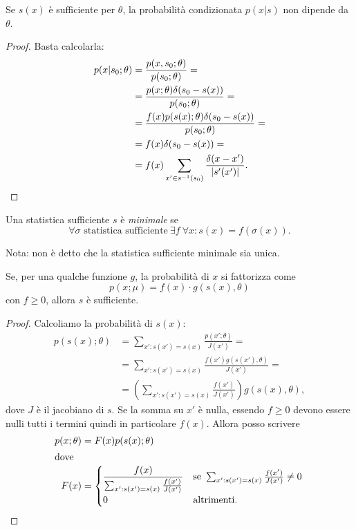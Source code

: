\begin{theorem}
	Se $s(x)$ è sufficiente per $\theta$,
	la probabilità condizionata $p(x|s)$ non dipende da $\theta$.
\end{theorem}

\begin{proof}
	Basta calcolarla:
	\begin{align*}
		p(x|s_0;\theta)
		&= \frac {p(x,s_0;\theta)} {p(s_0;\theta)} = \\
		&= \frac {p(x;\theta) \delta(s_0-s(x))} {p(s_0;\theta)} = \\
		&= \frac {f(x) p(s(x);\theta) \delta(s_0-s(x))} {p(s_0;\theta)} = \\
		&= f(x) \delta(s_0-s(x)) = \\
		&= f(x) \sum_{x'\in s^{-1}(s_0)} \frac {\delta(x-x')} {|s'(x')|}. \qedhere
	\end{align*}
\end{proof}

\begin{definition}
	Una statistica sufficiente $s$ è \emph{minimale} se
	\begin{equation*}
		\forall \sigma \text{ statistica sufficiente}\ \exists f\ \forall x:
		s(x) = f(\sigma(x)).
	\end{equation*}
\end{definition}
\noindent Nota: non è detto che la statistica sufficiente minimale sia unica.

\begin{theorem}
	\label{th:suffatt}
	Se, per una qualche funzione $g$, la probabilità di $x$ si fattorizza come
	\begin{equation*}
		p(x;\mu) = f(x)\cdot g(s(x),\theta)
	\end{equation*}
	con $f\ge 0$, allora $s$ è sufficiente.
\end{theorem}

\begin{proof}
	Calcoliamo la probabilità di $s(x)$:
	\begin{align*}
		p(s(x);\theta)
		&= \sum_{x':s(x')=s(x)} \frac{p(x';\theta)}{J(x')} = \\
		&= \sum_{x':s(x')=s(x)} \frac{f(x') g(s(x'),\theta)}{J(x')} = \\
		&= \left( \sum_{x':s(x')=s(x)} \frac{f(x')}{J(x')} \right) g(s(x),\theta),
	\end{align*}
	dove $J$ è il jacobiano di $s$.
	Se la somma su $x'$ è nulla,
	essendo $f\ge 0$ devono essere nulli tutti i termini quindi in particolare $f(x)$.
	Allora posso scrivere
	\begin{align*}
		p(x;\theta)
		&= F(x) p(s(x);\theta) \\
		\intertext{dove}
		F(x)
		&= \begin{cases}
			\displaystyle\frac{f(x)}{\sum_{x':s(x')=s(x)} \frac{f(x')}{J(x')}}
			& \text{se }\sum_{x':s(x')=s(x)} \frac{f(x')}{J(x')} \neq 0 \\
			0 & \text{altrimenti.}
		\end{cases} \qedhere
	\end{align*}
\end{proof}

